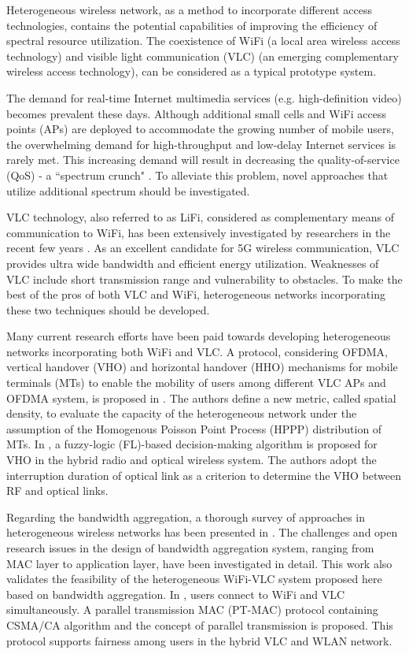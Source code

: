 \documentclass[10pt,journal]{IEEEtran}
\begin{document}
Heterogeneous wireless network, as a method to incorporate different access technologies, contains the potential capabilities of improving the efficiency of spectral resource utilization. The coexistence of WiFi (a local area wireless access technology) and visible light communication (VLC) (an emerging complementary wireless access technology), can be considered as a typical prototype system.

The demand for real-time Internet multimedia services (e.g. high-definition video) becomes prevalent these days. Although additional small cells and WiFi access points (APs) are deployed to accommodate the growing number of mobile users, the overwhelming demand for high-throughput and low-delay Internet services is rarely met. This increasing demand will result in decreasing the quality-of-service (QoS) - a ``spectrum crunch" \cite{kavehrad2013optical}. To alleviate this problem, novel approaches that utilize additional spectrum should be investigated.

VLC technology, also referred to as LiFi, considered as complementary means of communication to WiFi, has been extensively investigated by researchers in the recent few years \cite{wu2014visible}. As an excellent candidate for 5G wireless communication, VLC provides ultra wide bandwidth and efficient energy utilization. Weaknesses of VLC include short transmission range and vulnerability to obstacles. To make the best of the pros of both VLC and WiFi, heterogeneous networks incorporating these two techniques should be developed.

Many current research efforts have been paid towards developing heterogeneous networks incorporating both WiFi and VLC. A protocol, considering OFDMA, vertical handover (VHO) and horizontal handover (HHO) mechanisms for mobile terminals (MTs) to enable the mobility of users among different VLC APs and OFDMA system, is proposed in \cite{bao2014protocol}. The authors define a new metric, called spatial density, to evaluate the capacity of the heterogeneous network under the assumption of the Homogenous Poisson Point Process (HPPP) distribution of MTs. In \cite{hou2006vertical}, a fuzzy-logic (FL)-based decision-making algorithm is proposed for VHO in the hybrid radio and optical wireless system. The authors adopt the interruption duration of optical link as a criterion to determine the VHO between RF and optical links.

Regarding the bandwidth aggregation, a thorough survey of approaches in heterogeneous wireless networks has been presented in \cite{ramaboli2012bandwidth}. The challenges and open research issues in the design of bandwidth aggregation system, ranging from MAC layer to application layer, have been investigated in detail. This work also validates the feasibility of the heterogeneous WiFi-VLC system proposed here based on bandwidth aggregation. In \cite{guo2015parallel}, users connect to WiFi and VLC simultaneously. A parallel transmission MAC (PT-MAC) protocol containing CSMA/CA algorithm and the concept of parallel transmission is proposed. This protocol supports fairness among users in the hybrid VLC and WLAN network.
\end{document}
